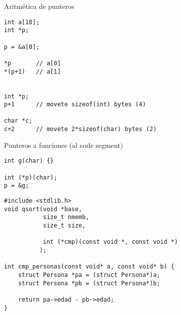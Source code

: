 \begin{frame}[fragile]{Aritm\'etica de punteros}
         \begin{lstlisting}[style=normal]
int a[10];
int *p;

p = &a[0];

*p       // a[0]
*(p+1)   // a[1]


int *p;
p+1      // movete sizeof(int) bytes (4)

char *c;
c+2      // movete 2*sizeof(char) bytes (2)

         \end{lstlisting}
\end{frame}

\begin{frame}[fragile]{Punteros a funciones (al code segment)}
         \begin{lstlisting}[style=normal]
int g(char) {}

int (*p)(char);
p = &g;
         \end{lstlisting}
\pause
         \begin{lstlisting}[style=normal]
#include <stdlib.h>
void qsort(void *base,
           size_t nmemb,
           size_t size,

           int (*cmp)(const void *, const void *)
          );

int cmp_personas(const void* a, const void* b) {
    struct Persona *pa = (struct Persona*)a;
    struct Persona *pb = (struct Persona*)b;

    return pa->edad - pb->edad;
}

         \end{lstlisting}
\end{frame}


